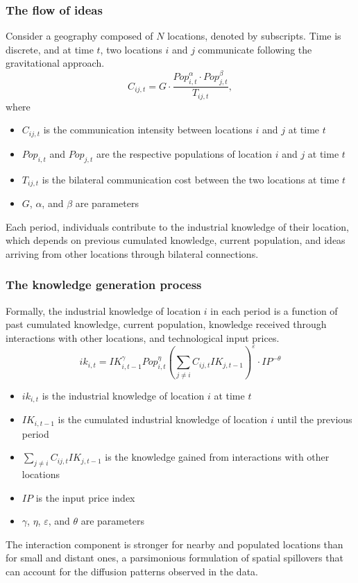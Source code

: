 \documentclass[letterpaper,12pt,leqno]{article}
\begin{document}
\subsubsection*{The flow of ideas}
Consider a geography composed of \(N\) locations, denoted by subscripts. Time is discrete, and at time \(t\), two locations \(i\) and \(j\) communicate following the gravitational approach.
\begin{equation}
  \label{eq:connection}
  C_{ij,t}=G\cdot\frac{{Pop}_{i,t}^\alpha   \cdot   Pop_{j,t}^\beta}{T_{ij,t}},
\end{equation}
where
\begin{itemize}
  \item \(C_{ij,t}\) is the communication intensity between locations \(i\) and \(j\) at time \(t\)
  \item \(Pop_{i,t}\) and \(Pop_{j,t}\) are the respective populations of location \(i\) and \(j\) at time \(t\)
  \item \(T_{ij,t}\) is the bilateral communication cost between the two locations at time \(t\)
  \item \(G\), \(\alpha\), and \(\beta\) are parameters
\end{itemize}
Each period, individuals contribute to the industrial knowledge of their location, which depends on previous cumulated knowledge, current population, and ideas arriving from other locations through bilateral connections.
\subsubsection*{The knowledge generation process}
Formally, the industrial knowledge of location \(i\) in each period is a function of past cumulated knowledge, current population, knowledge received through interactions with other locations, and technological input prices.
\begin{equation}
  \label{eq:knowledge}
  ik_{i,t} = IK_{i,t-1}^\gamma Pop_{i,t}^\eta \left( \sum_{j\neq i}C_{ij,t}IK_{j,t-1}\right)^\varepsilon \cdot IP^{-\theta}
\end{equation}
\begin{itemize}
  \item \(ik_{i,t}\) is the industrial knowledge of location \(i\) at time \(t\)
  \item \(IK_{i,t-1}\) is the cumulated industrial knowledge of location \(i\) until the previous period
  \item \(\sum_{j\neq i} C_{ij,t} IK_{j,t-1}\) is the knowledge gained from interactions with other locations
  \item \(IP\) is the input price index
  \item \(\gamma\), \(\eta\), \(\varepsilon\), and \(\theta\) are parameters
\end{itemize}
The interaction component is stronger for nearby and populated locations than for small and distant ones, a parsimonious formulation of spatial spillovers that can account for the diffusion patterns observed in the data.
\end{document}

